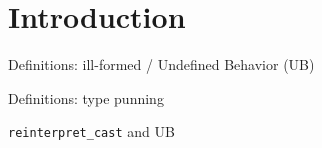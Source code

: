 \section{Introduction}

\begin{frame}{Definitions: ill-formed / Undefined Behavior (UB)}
\end{frame}

\begin{frame}{Definitions: type punning}
\end{frame}

\begin{frame}{\texttt{reinterpret\_cast} and UB}
\end{frame}
